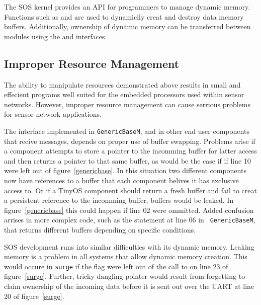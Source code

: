 The SOS kernel provides an API for programmers to manage dynamic
memory.  
Functions such as  and  are used to
dynamiclly creat and destroy data memory buffers.  Additionally,
ownership of dynamic memory can be transferred between modules using
the  and  interfaces.




\subsection{Improper Resource Management}

The ability to manipulate resources demonstrated above results in
small and effecient programs well suited for the embedded processors
used within sensor networks.  However, improper resource management
can cause serrious problems for sensor network applications.


\smallskip{}

The  interface implemented in {\tt GenericBaseM}, and in
other end user components that recive messages, depends on proper use
of buffer swapping.  Problems arise if a component attempts to store a
pointer to the incomming buffer for latter access and then returns a
pointer to that same buffer, as would be the case if if line 10 were
left out of figure~\ref{genericbase}.  In this situation two different
components now have references to a buffer that each component belives
it has exclusive access to.  Or if a TinyOS component should return a
fresh buffer and fail to creat a persistent reference to the incomming
buffer, buffers would be leaked.  In figure~\ref{genericbase} this
could happen if line 02 were ommitted.  Added confusion arrises in
more complex code, such as the  statement at line 06 in {\tt
GenericBaseM}, that returns different buffers depending on specific
conditions. 


\smallskip{}

SOS development runs into similar difficulties with its dynamic
memory.  Leaking memory is a problem in all systems that allow dynamic
memory creation.  This would occure in {\tt surge} if the
 flag were left out of the call to
 on line 23 of figure~\ref{surge}.  Further, tricky
dangling pointer would result from forgetting to claim ownership of
the incoming data before it is sent out over the UART at line 20 of
figure~\ref{surge}.


